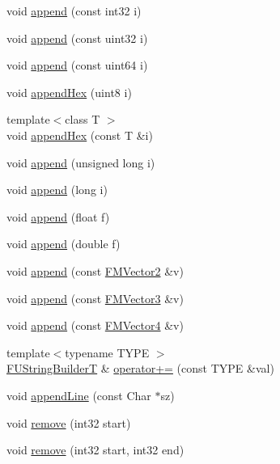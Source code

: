 \begin{DoxyCompactItemize}
void \hyperlink{classFUStringBuilderT_a9f6cb1cc412a4f668aa4f13c96e3123f}{append} (const int32 i)
\item 
void \hyperlink{classFUStringBuilderT_a1a16bb77d7263cf01c2c1a830486ea65}{append} (const uint32 i)
\item 
void \hyperlink{classFUStringBuilderT_a8bb9b4972083b2ed3f8e468e08433f00}{append} (const uint64 i)
\item 
void \hyperlink{classFUStringBuilderT_a79b11382b7de987fcd39dd3e5e1c46df}{appendHex} (uint8 i)
\item 
{\footnotesize template$<$class T $>$ }\\void \hyperlink{classFUStringBuilderT_a0161b2dbfccbb2bdd9b6dff22d36cbe4}{appendHex} (const T \&i)
\item 
void \hyperlink{classFUStringBuilderT_a5a7e03af7f6bba4b7ac6bf80578b6c60}{append} (unsigned long i)
\item 
void \hyperlink{classFUStringBuilderT_a4f3055b60d9c69e3bebdddd15e1d9944}{append} (long i)
\item 
void \hyperlink{classFUStringBuilderT_a76bfc61012979ee1a8d35ec620eb1565}{append} (float f)
\item 
void \hyperlink{classFUStringBuilderT_ad7d3c928169a05d84ed0d0018a81605c}{append} (double f)
\item 
void \hyperlink{classFUStringBuilderT_a0b3ed525e7d516e0fbe3de41af5aeca4}{append} (const \hyperlink{classFMVector2}{FMVector2} \&v)
\item 
void \hyperlink{classFUStringBuilderT_a494dcb8522bb0512f71bde1fea45fdcc}{append} (const \hyperlink{classFMVector3}{FMVector3} \&v)
\item 
void \hyperlink{classFUStringBuilderT_ac031ffc7004c46f3c3a0ec0799733e75}{append} (const \hyperlink{classFMVector4}{FMVector4} \&v)
\item 
{\footnotesize template$<$typename TYPE $>$ }\\\hyperlink{classFUStringBuilderT}{FUStringBuilderT} \& \hyperlink{classFUStringBuilderT_ab721552d7de380e056fd7bf0eb4005dd}{operator+=} (const TYPE \&val)
\item 
void \hyperlink{classFUStringBuilderT_a97010c6e8578f54c69e3b63f86f0a22f}{appendLine} (const Char $\ast$sz)
\item 
void \hyperlink{classFUStringBuilderT_a4c9b7d5e462ef7e71e789de3e6c602ea}{remove} (int32 start)
\item 
void \hyperlink{classFUStringBuilderT_afe012eb9649bab74ad823f2cfc8e8482}{remove} (int32 start, int32 end)
\item 

\end{DoxyCompactItemize}
